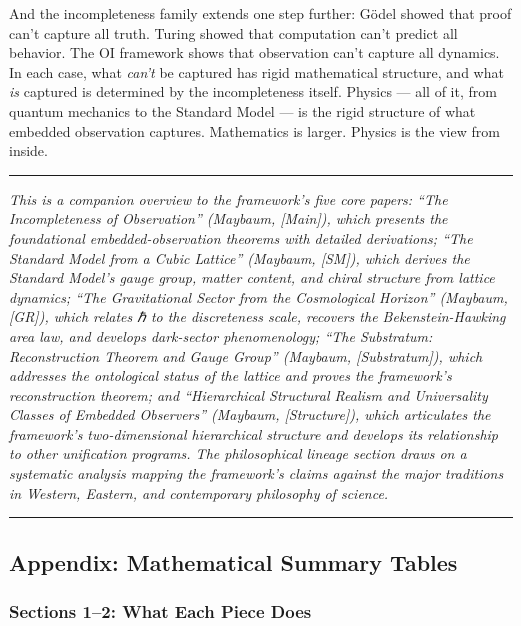 \documentclass[
]{article}
\begin{document}
And the incompleteness family extends one step further: Gödel showed
that proof can't capture all truth. Turing showed that computation can't
predict all behavior. The OI framework shows that observation can't
capture all dynamics. In each case, what \emph{can't} be captured has
rigid mathematical structure, and what \emph{is} captured is determined
by the incompleteness itself. Physics --- all of it, from quantum
mechanics to the Standard Model --- is the rigid structure of what
embedded observation captures. Mathematics is larger. Physics is the
view from inside.

\begin{center}\rule{0.5\linewidth}{0.5pt}\end{center}

\emph{This is a companion overview to the framework's five core papers:
``The Incompleteness of Observation'' (Maybaum, {[}Main{]}), which
presents the foundational embedded-observation theorems with detailed
derivations; ``The Standard Model from a Cubic Lattice'' (Maybaum,
{[}SM{]}), which derives the Standard Model's gauge group, matter
content, and chiral structure from lattice dynamics; ``The Gravitational
Sector from the Cosmological Horizon'' (Maybaum, {[}GR{]}), which
relates ℏ to the discreteness scale, recovers the Bekenstein-Hawking
area law, and develops dark-sector phenomenology; ``The Substratum:
Reconstruction Theorem and Gauge Group'' (Maybaum, {[}Substratum{]}),
which addresses the ontological status of the lattice and proves the
framework's reconstruction theorem; and ``Hierarchical Structural
Realism and Universality Classes of Embedded Observers'' (Maybaum,
{[}Structure{]}), which articulates the framework's two-dimensional
hierarchical structure and develops its relationship to other
unification programs. The philosophical lineage section draws on a
systematic analysis mapping the framework's claims against the major
traditions in Western, Eastern, and contemporary philosophy of science.}

\begin{center}\rule{0.5\linewidth}{0.5pt}\end{center}

\hypertarget{appendix-mathematical-summary-tables}{%
\subsection{Appendix: Mathematical Summary
Tables}\label{appendix-mathematical-summary-tables}}

\hypertarget{sections-12-what-each-piece-does}{%
\subsubsection{Sections 1--2: What Each Piece
Does}\label{sections-12-what-each-piece-does}}
\end{document}
